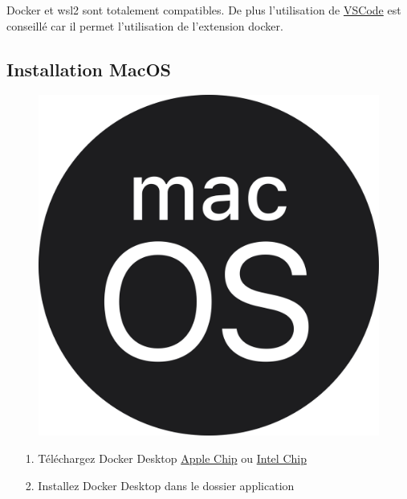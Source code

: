 \documentclass[internal]{nhitec_design}
\begin{document}
        Docker et wsl2 sont totalement compatibles. De plus l'utilisation de \href{https://code.visualstudio.com/docs/remote/wsl}{VSCode} est conseillé car il permet l'utilisation de l'extension docker.



    \subsection{Installation MacOS}

        \begin{figure}[h]
            \centering
            \includegraphics[scale=0.025]{Images_formation/MacosLogo.png}
        \end{figure}

        \begin{itemize}
            \item[1.] Téléchargez Docker Desktop \href{https://desktop.docker.com/mac/main/arm64/Docker.dmg?utm_source=docker&utm_medium=webreferral&utm_campaign=dd-smartbutton&utm_location=module}{Apple Chip} ou \href{https://desktop.docker.com/mac/main/amd64/Docker.dmg?utm_source=docker&utm_medium=webreferral&utm_campaign=dd-smartbutton&utm_location=module}{Intel Chip}
            \item[2.] Installez Docker Desktop dans le dossier application
        \end{itemize}
\end{document}
